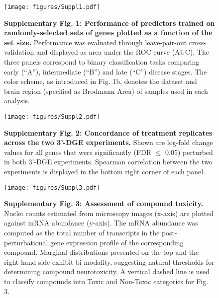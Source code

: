 \documentclass{article}
\begin{document}

\begin{figure}
  \begin{center}
    \texttt{[image: figures/Suppl1.pdf]}
  \end{center}
  \caption*{\textbf{Supplementary Fig. 1: Performance of predictors trained on randomly-selected sets of genes plotted as a function of the set size.} Performance was evaluated through leave-pair-out cross-validation and displayed as area under the ROC curve (AUC). The three panels correspond to binary classification tasks comparing early (“A”), intermediate (“B”) and late (“C”) disease stages. The color scheme, as introduced in Fig. 1b, denotes the dataset and brain region (specified as Brodmann Area) of samples used in each analysis.}
\end{figure}


\begin{figure}
  \begin{center}
    \texttt{[image: figures/Suppl2.pdf]}
  \end{center}
\caption*{\textbf{Supplementary Fig. 2: Concordance of treatment replicates across the two 3’-DGE experiments.} Shown are log-fold change values for all genes that were significantly (FDR $\leq$ 0.05) perturbed in both 3’-DGE experiments. Spearman correlation between the two experiments is displayed in the bottom right corner of each panel.}
\end{figure}


\begin{figure}
  \begin{center}
    \texttt{[image: figures/Suppl3.pdf]}
  \end{center}
  \caption*{\textbf{Supplementary Fig. 3: Assessment of compound toxicity.} Nuclei counts estimated from microscopy images (x-axis) are plotted against mRNA abundance (y-axis). The mRNA abundance was computed as the total number of transcripts in the post-perturbational gene expression profile of the corresponding compound. Marginal distributions presented on the top and the right-hand side exhibit bi-modality, suggesting natural thresholds for determining compound neurotoxicity. A vertical dashed line is used to classify compounds into Toxic and Non-Toxic categories for Fig. 3.}
\end{figure}
\end{document}
